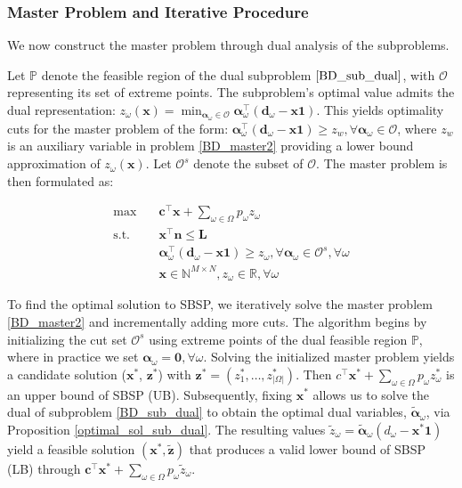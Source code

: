 \subsubsection{Master Problem and Iterative Procedure}
We now construct the master problem through dual analysis of the subproblems. 


Let $\mathbb{P}$ denote the feasible region of the dual subproblem $\eqref{BD_sub_dual}$, with $\mathcal{O}$ representing its set of extreme points. The subproblem's optimal value admits the dual representation: $z_{\omega}(\mathbf{x}) = \min_{\bm{\alpha}_{\omega} \in \mathcal{O}} \bm{\alpha}_{\omega}^{\intercal}(\mathbf{d}_{\omega}- \mathbf{x} \mathbf{1})$. This yields optimality cuts for the master problem of the form: $\bm{\alpha}_{\omega}^{\intercal}(\mathbf{d}_{\omega}- \mathbf{x} \mathbf{1}) \geq z_w, \forall \bm{\alpha}_{\omega} \in \mathcal{O}$, where $z_w$ is an auxiliary variable in problem \eqref{BD_master2} providing a lower bound approximation of $z_{\omega}(\mathbf{x})$. Let $\mathcal{O}^{s}$ denote the subset of $\mathcal{O}$. The master problem is then formulated as:

\begin{equation}\label{BD_master2}
  \begin{aligned}
    \max \quad & \mathbf{c}^{\intercal} \mathbf{x} + \sum_{\omega \in \Omega} p_{\omega} z_{\omega} \\
    \text {s.t.} \quad & \mathbf{x}^{\intercal} \mathbf{n}  \leq \mathbf{L} \\
    & \bm{\alpha}_{\omega}^{\intercal}(\mathbf{d}_{\omega}- \mathbf{x} \mathbf{1}) \geq z_{\omega}, \forall \bm{\alpha}_{\omega} \in \mathcal{O}^{s}, \forall \omega \\
     & \mathbf{x} \in \mathbb{N}^{M \times N}, z_{\omega} \in \mathbb{R}, \forall \omega
  \end{aligned}
\end{equation}


To find the optimal solution to SBSP, we iteratively solve the master problem \eqref{BD_master2} and incrementally adding more cuts. The algorithm begins by initializing the cut set $\mathcal{O}^{s}$ using extreme points of the dual feasible region $\mathbb{P}$, where in practice we set $\bm{\alpha}_{\omega} = \mathbf{0}, \forall \omega$. Solving the initialized master problem yields a candidate solution ($\mathbf{x}^{*}$, $\mathbf{z}^{*}$) with $\mathbf{z}^{*} =(z^{*}_1,\ldots, z^{*}_{|\Omega|})$. Then $c^{\intercal} \mathbf{x}^{*} + \sum_{\omega \in \Omega} p_{\omega} z_{\omega}^{*}$ is an upper bound of SBSP (UB). Subsequently, fixing $\mathbf{x}^{*}$ allows us to solve the dual of subproblem \eqref{BD_sub_dual} to obtain the optimal dual variables, $\bm{\tilde{\alpha}}_{\omega}$, via Proposition \ref{optimal_sol_sub_dual}. The resulting values $\tilde{z}_{\omega} = \bm{\tilde{\alpha}}_{\omega}(d_{\omega} - \mathbf{x}^{*} \mathbf{1})$ yield a feasible solution $(\mathbf{x}^{*}, \mathbf{\tilde{z}})$ that produces a valid lower bound of SBSP (LB) through $\mathbf{c}^{\intercal} \mathbf{x}^{*} + \sum_{\omega \in \Omega} p_{\omega} \tilde{z}_{\omega}$.

